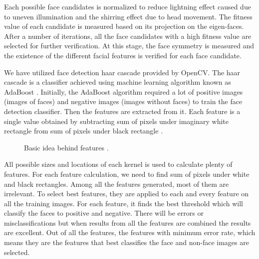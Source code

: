 \documentclass[9pt,twocolumn,twoside]{../../styles/osajnl}
\begin{document}
Each possible face candidates is normalized to reduce lightning effect
caused due to uneven illumination and the shirring effect due to head
movement. The fitness value of each candidate is measured based on its
projection on the eigen-faces. After a number of iterations, all the
face candidates with a high fitness value are selected for further
verification. At this stage, the face symmetry is measured and the
existence of the different facial features is verified for each face
candidate.

We have utilized face detection haar cascade provided by OpenCV. The
haar cascade is a classifier achieved using machine learning algorithm
known as AdaBoost \cite{www-adaboost-wiki}. Initially, the AdaBoost
algorithm required a lot of positive images (images of faces) and
negative images (images without faces) to train the face detection
classifier. Then the features are extracted from it. Each feature is a
single value obtained by subtracting sum of pixels under imaginary
white rectangle from sum of pixels under black rectangle
\cite{fd-using-haar}.

\begin{figure}[htbp]
\centering
{}
\caption{Basic idea behind features \cite{fd-using-haar}.}
\label{fig:false-color}
\end{figure}

All possible sizes and locations of each kernel is used to calculate
plenty of features. For each feature calculation, we need to find sum
of pixels under white and black rectangles. Among all the features
generated, most of them are irrelevant. To select best features, they
are applied to each and every feature on all the training images. For
each feature, it finds the best threshold which will classify the
faces to positive and negative. There will be errors or
misclassifications but when results from all the features are combined
the results are excellent. Out of all the features, the features with
minimum error rate, which means they are the features that best
classifies the face and non-face images are selected.
\end{document}

